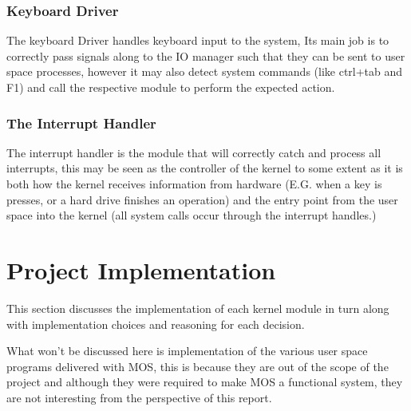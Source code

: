 \documentclass[a4paper]{report}
\begin{document}
\subsection{Keyboard Driver}

The keyboard Driver handles keyboard input to the system, Its main job is to correctly pass signals along to the IO manager such that they can be sent to user space processes, however it may also detect system commands (like ctrl+tab and F1) and call the respective module to perform the expected action.

\subsection{The Interrupt Handler}

The interrupt handler is the module that will correctly catch and process all interrupts, this may be seen as the controller of the kernel to some extent as it is both how the kernel receives information from hardware (E.G. when a key is presses, or a hard drive finishes an operation) and the entry point from the user space into the kernel (all system calls occur through the interrupt handles.)












































\chapter{Project Implementation}

This section discusses the implementation of each kernel module in turn along with implementation choices and reasoning for each decision.

What won't be discussed here is implementation of the various user space programs delivered with MOS, this is because they are out of the scope of the project and although they were required to make MOS a functional system, they are not interesting from the perspective of this report.
\end{document}
